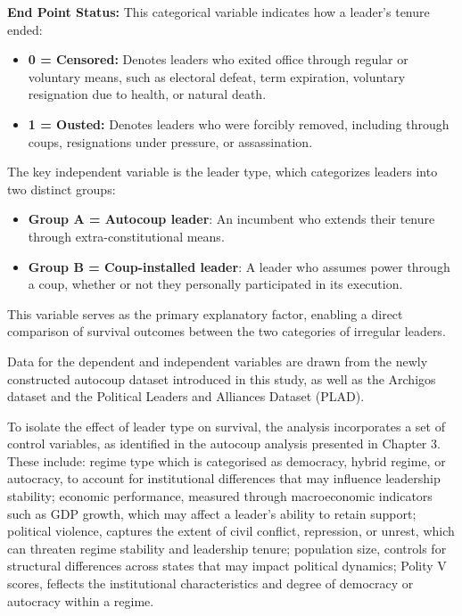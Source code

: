 \documentclass[
  12pt,
]{report}
\providecommand{\tightlist}{%
  \setlength{\itemsep}{0pt}\setlength{\parskip}{0pt}}
\begin{document}
\textbf{End Point Status:} This categorical variable indicates how a
leader's tenure ended:

\begin{itemize}
\item
  \textbf{0 = Censored:} Denotes leaders who exited office through
  regular or voluntary means, such as electoral defeat, term expiration,
  voluntary resignation due to health, or natural death.
\item
  \textbf{1 = Ousted:} Denotes leaders who were forcibly removed,
  including through coups, resignations under pressure, or
  assassination.
\end{itemize}

The key independent variable is the leader type, which categorizes
leaders into two distinct groups:

\begin{itemize}
\tightlist
\item
  \textbf{Group A = Autocoup leader}: An incumbent who extends their
  tenure through extra-constitutional means.
\item
  \textbf{Group B = Coup-installed leader}: A leader who assumes power
  through a coup, whether or not they personally participated in its
  execution.
\end{itemize}

This variable serves as the primary explanatory factor, enabling a
direct comparison of survival outcomes between the two categories of
irregular leaders.

Data for the dependent and independent variables are drawn from the
newly constructed autocoup dataset introduced in this study, as well as
the Archigos dataset and the Political Leaders and Alliances Dataset
(PLAD).

To isolate the effect of leader type on survival, the analysis
incorporates a set of control variables, as identified in the autocoup
analysis presented in Chapter 3. These include: regime type which is
categorised as democracy, hybrid regime, or autocracy, to account for
institutional differences that may influence leadership stability;
economic performance, measured through macroeconomic indicators such as
GDP growth, which may affect a leader's ability to retain support;
political violence, captures the extent of civil conflict, repression,
or unrest, which can threaten regime stability and leadership tenure;
population size, controls for structural differences across states that
may impact political dynamics; Polity V scores, feflects the
institutional characteristics and degree of democracy or autocracy
within a regime.
\end{document}
